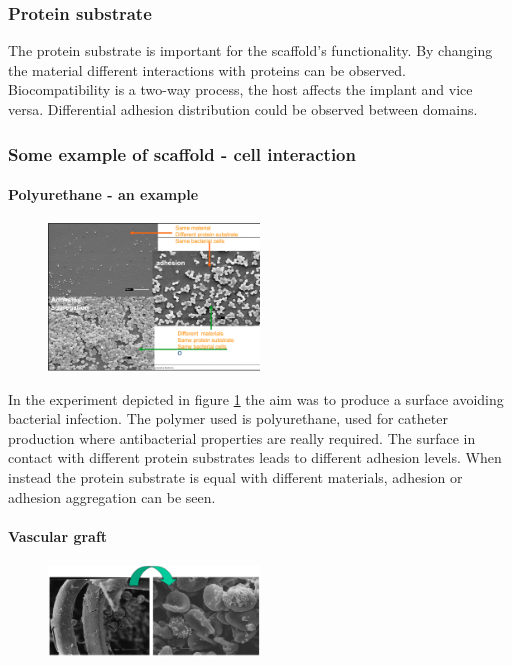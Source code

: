 		\subsubsection{Protein substrate}
		The protein substrate is important for the scaffold's functionality.
		By changing the material different interactions with proteins can be observed.
		Biocompatibility is a two-way process, the host affects the implant and vice versa.
		Differential adhesion distribution could be observed between domains.

		\subsubsection{Some example of scaffold - cell interaction}

			\paragraph{Polyurethane - an example}

			\begin{figure}[h]
				\centering
				\includegraphics[width=0.5\textwidth]{polyu}
				\caption{\label{fig:polyu}}
			\end{figure}

			In the experiment depicted in figure \ref{fig:polyu} the aim was to produce a surface avoiding bacterial infection.
			The polymer used is polyurethane, used for catheter production where antibacterial properties are really required.
			The surface in contact with different protein substrates leads to different adhesion levels.
			When instead the protein substrate is equal with different materials, adhesion or adhesion aggregation can be seen.

			\paragraph{Vascular graft}

			\begin{figure}[h]
				\includegraphics[width=0.5\textwidth]{vascular}
				\centering
				\caption{\label{fig:vascular}}
			\end{figure}

